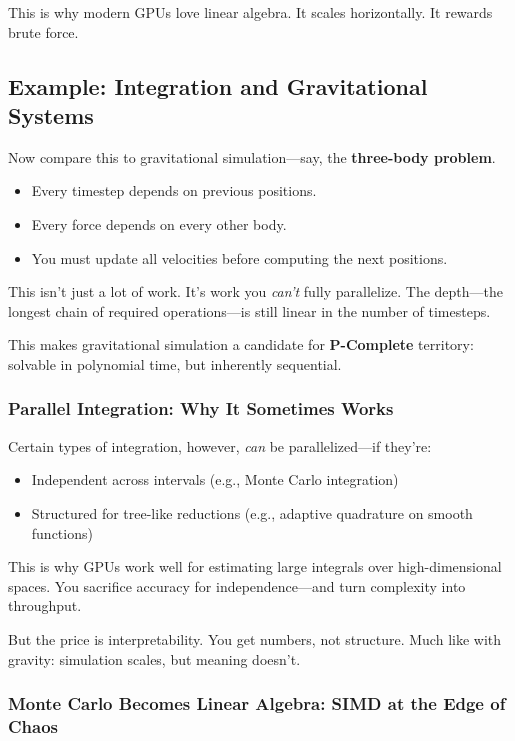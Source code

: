 This is why modern GPUs love linear algebra. It scales horizontally. It rewards brute force.

\subsection*{Example: Integration and Gravitational Systems}

Now compare this to gravitational simulation—say, the \textbf{three-body problem}.

\begin{itemize}
  \item Every timestep depends on previous positions.
  \item Every force depends on every other body.
  \item You must update all velocities before computing the next positions.
\end{itemize}

This isn’t just a lot of work. It’s work you \textit{can’t} fully parallelize. The depth—the longest chain of required operations—is still linear in the number of timesteps.

This makes gravitational simulation a candidate for \textbf{P-Complete} territory: solvable in polynomial time, but inherently sequential.

\subsubsection{Parallel Integration: Why It Sometimes Works}

Certain types of integration, however, \textit{can} be parallelized—if they’re:

\begin{itemize}
  \item Independent across intervals (e.g., Monte Carlo integration)
  \item Structured for tree-like reductions (e.g., adaptive quadrature on smooth functions)
\end{itemize}

This is why GPUs work well for estimating large integrals over high-dimensional spaces. You sacrifice accuracy for independence—and turn complexity into throughput.

But the price is interpretability. You get numbers, not structure. Much like with gravity: simulation scales, but meaning doesn’t.


\subsubsection{Monte Carlo Becomes Linear Algebra: SIMD at the Edge of Chaos}

